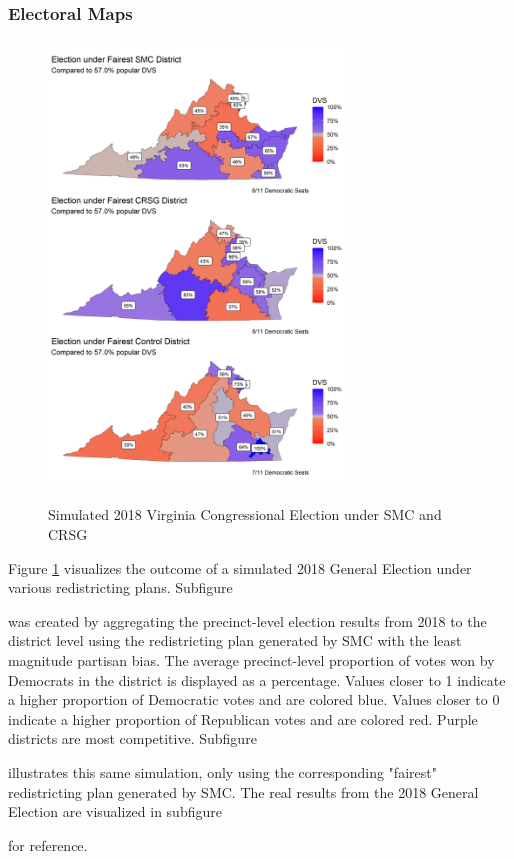 \subsubsection{Electoral Maps}
\begin{figure}
    \centering
    \caption{Simulated 2018 Virginia Congressional Election under SMC and CRSG}
    \includegraphics[width=0.7\textwidth]{img/election.map.png}
    \label{fig:election.map}
    \raggedright
\end{figure}

Figure \ref{fig:election.map} visualizes the outcome of a simulated 2018 General Election under various redistricting plans. Subfigure 
\begin{seriate} 
    \item  was created by aggregating the precinct-level election results from 2018 to the district level using the redistricting plan generated by SMC with the least magnitude partisan bias. The average precinct-level proportion of votes won by Democrats in the district is displayed as a percentage. Values closer to 1 indicate a higher proportion of Democratic votes and are colored blue. Values closer to 0 indicate a higher proportion of Republican votes and are colored red. Purple districts are most competitive. Subfigure 
    \item illustrates this same simulation, only using the corresponding "fairest" redistricting plan generated by SMC. The real results from the 2018 General Election are visualized in subfigure 
    \item for reference. 
\end{seriate}

